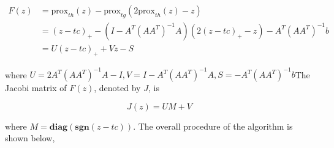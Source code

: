 \documentclass[a4paper]{article}
\begin{document}
\begin{equation}
\begin{aligned}
F(z)&=\mathrm{prox}_{th}(z)-\mathrm{prox}_{tg}(2\mathrm{prox}_{th}(z)-z) \\
&=(z-tc)_+ - (I-A^T(AA^T)^{-1}A)(2(z-tc)_+ -z)- A^T(AA^T)^{-1}b \\
&= U(z-tc)_++Vz-S
\end{aligned}
\end{equation}

where $U = 2A^T(AA^T)^{-1}A-I, V = I-A^T(AA^T)^{-1}A, S = -A^T(AA^T)^{-1}b$The Jacobi matrix of $F(z)$, denoted by $J$, is

\begin{equation}
J(z)=UM+V
\end{equation}

where $M = \mathbf{diag}(\mathbf{sgn}(z-tc))$. The overall procedure of the algorithm is shown below, 
\end{document}
